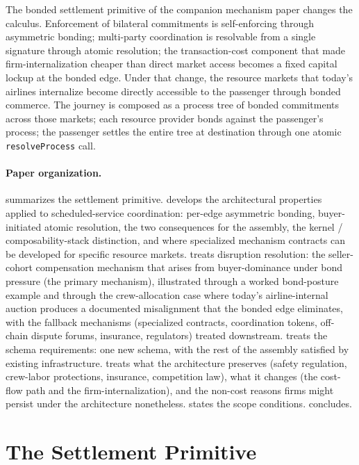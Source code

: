 \documentclass[11pt,a4paper]{article}
\theoremstyle{definition}
\theoremstyle{remark}
\begin{document}
The bonded settlement primitive of the companion mechanism paper
changes the calculus. Enforcement of bilateral commitments is
self-enforcing through asymmetric bonding; multi-party
coordination is resolvable from a single signature through atomic
resolution; the transaction-cost component that made
firm-internalization cheaper than direct market access becomes a
fixed capital lockup at the bonded edge. Under that change, the
resource markets that today's airlines internalize become
directly accessible to the passenger through bonded commerce. The
journey is composed as a process tree of bonded commitments
across those markets; each resource provider bonds against the
passenger's process; the passenger settles the entire tree at
destination through one atomic \texttt{resolveProcess} call.

\paragraph{Paper organization.}
 summarizes the settlement primitive.
 develops the architectural properties applied
to scheduled-service coordination: per-edge asymmetric bonding,
buyer-initiated atomic resolution, the two consequences for the
assembly, the kernel / composability-stack distinction, and where
specialized mechanism contracts can be developed for specific
resource markets.  treats disruption
resolution: the seller-cohort compensation mechanism that arises
from buyer-dominance under bond pressure (the primary mechanism),
illustrated through a worked bond-posture example and through the
crew-allocation case where today's airline-internal auction
produces a documented misalignment that the bonded edge
eliminates, with the fallback mechanisms (specialized contracts,
coordination tokens, off-chain dispute forums, insurance,
regulators) treated downstream.  treats the
schema requirements: one new schema, with the rest of the
assembly satisfied by existing infrastructure.
 treats what the architecture preserves
(safety regulation, crew-labor protections, insurance,
competition law), what it changes (the cost-flow path and the
firm-internalization), and the non-cost reasons firms might
persist under the architecture nonetheless.
 states the scope conditions.
 concludes.

\section{The Settlement Primitive}
\label{sec:primitive}
\end{document}
